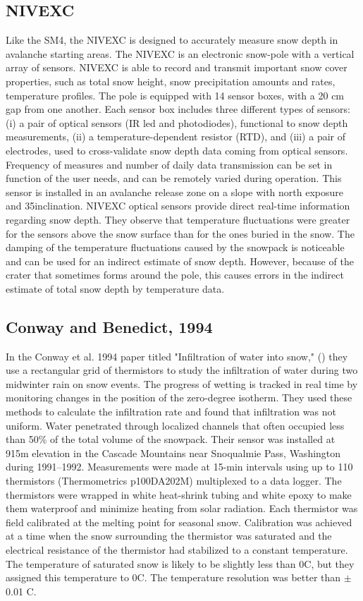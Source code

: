 \subsection{NIVEXC \cite{barbolininivexc}}  
Like the SM4, the NIVEXC is designed to accurately measure snow depth in avalanche starting areas. The NIVEXC is an electronic snow-pole with a vertical array of sensors. NIVEXC is able to record and transmit important snow cover properties, such as total snow height, snow precipitation amounts and rates, temperature profiles. The pole is equipped with 14 sensor boxes, with a 20 cm gap from one another. Each sensor box includes three different types of sensors: (i) a pair of optical sensors (IR led and photodiodes), functional to snow depth measurements, (ii) a temperature-dependent resistor (RTD), and (iii) a pair of electrodes, used to cross-validate snow depth data coming from optical sensors. Frequency of measures and number of daily data transmission can be set in function of the user needs, and can be remotely varied during operation. This sensor is installed in an avalanche release zone on a slope with north exposure and 35\textdegree inclination. NIVEXC optical sensors provide direct real-time information regarding snow depth. They observe that temperature fluctuations were greater for the sensors above the snow surface than for the ones buried in the snow. The damping of the temperature fluctuations caused by the snowpack is noticeable and can be used for an indirect estimate of snow depth. However, because of the crater that sometimes forms around the pole, this causes errors in the indirect estimate of total snow depth by temperature data. 

\subsection{Conway and Benedict, 1994} 
In the Conway et al. 1994 paper titled "Infiltration of water into snow," (\cite{conway_benedict_1994}) they use a rectangular grid of thermistors to study the infiltration of water during two midwinter rain on snow events. The progress of wetting is tracked in real time by monitoring changes in the position of the zero-degree isotherm. They used these methods to calculate the infiltration rate and found that infiltration was not uniform. Water penetrated through localized channels that often occupied less than 50\% of the total volume of the snowpack. Their sensor was installed at 915m elevation in the Cascade Mountains near Snoqualmie Pass, Washington during 1991--1992. Measurements were made at 15-min intervals using up to 110 thermistors (Thermometrics p100DA202M) multiplexed to a data logger. The thermistors were wrapped in white heat-shrink tubing and white epoxy to make them waterproof and minimize heating from solar radiation. Each thermistor was field calibrated at the melting point for seasonal snow. Calibration was achieved at a time when the snow surrounding the thermistor was saturated and the electrical resistance of the thermistor had stabilized to a constant temperature. The temperature of saturated snow is likely to be slightly less than 0\textdegree C, but they assigned this temperature to 0\textdegree C. The temperature resolution was better than $\pm$ 0.01 \textdegree C.
 

